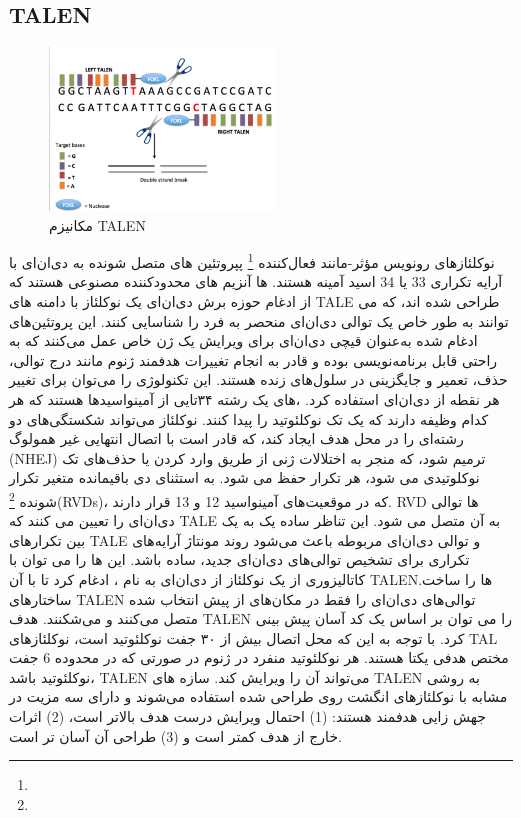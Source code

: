 \documentclass[12pt,a4paper,BCOR=.7cm,headsepline,bibliography=totoc]{report}
\begin{document}
\subsection{TALEN}
\begin{figure}
\centering
\includegraphics[width=6cm, ]{pictures/Overview_of_TALENs.png}
\caption{
مکانیزم TALEN \cite{graph3}
}\label{wrap-fig:4}
\end{figure}
نوکلئازهای رونویس مؤثر-مانند فعال‌کننده
\footnote{} 
 پپروتئین های متصل شونده به دی‌ان‌ای با آرایه تکراری 33 یا 34 اسید آمینه هستند.
ها آنزیم های محدودکننده مصنوعی هستند که از ادغام حوزه برش دی‌ان‌ای یک نوکلئاز با دامنه های TALE طراحی شده اند، که می توانند به طور خاص یک توالی دی‌ان‌ای منحصر به فرد را شناسایی کنند. این پروتئین‌های ادغام شده به‌عنوان قیچی دی‌ان‌ای برای ویرایش یک ژن خاص عمل می‌کنند که به‌ راحتی قابل برنامه‌نویسی بوده و قادر به انجام تغییرات هدفمند ژنوم مانند درج توالی، حذف، تعمیر و جایگزینی در سلول‌های زنده هستند.\cite{TALEN1} این تکنولوژی را می‌توان برای تغییر هر نقطه از دی‌ان‌ای استفاده کرد.
 ،های
 یک رشته ۳۴تایی از آمینو‌اسید‌ها هستند که هر کدام وظیفه دارند که یک تک نوکلئوتید را پیدا کنند. نوکلئاز می‌تواند شکستگی‌های دو رشته‌ای را در محل هدف ایجاد کند، که قادر است با اتصال انتهایی غیر همولوگ (NHEJ) ترمیم شود، که منجر به اختلالات ژنی از طریق وارد کردن یا حذف‌های تک نوکلوتیدی می شود، هر تکرار حفظ می شود. به استثنای دی باقیمانده متغیر تکرار شونده
\footnote{}(RVDs)،
 که در موقعیت‌های آمینواسید 12 و 13 قرار دارند. RVD ها توالی دی‌ان‌ای را تعیین می کنند که TALE به آن متصل می شود. این تناظر ساده یک به یک بین تکرارهای TALE و توالی دی‌ان‌ای مربوطه باعث می‌شود روند مونتاژ آرایه‌های تکراری برای تشخیص توالی‌های دی‌ان‌ای جدید، ساده باشد. این 
ها
 را می توان با کاتالیزوری از یک نوکلئاز از دی‌ان‌ای به نام 
، ادغام کرد تا با آن TALENها را ساخت. ساختارهای TALEN توالی‌های دی‌ان‌ای را فقط در مکان‌های از پیش انتخاب شده متصل می‌کنند و می‌شکنند. هدف TALEN را می توان بر اساس یک کد آسان پیش بینی کرد. با توجه به این که محل اتصال بیش از ۳۰ جفت نوکلئوتید است، نوکلئازهای TAL مختص هدفی یکتا هستند. هر نوکلئوتید منفرد در ژنوم در صورتی که در محدوده 6 جفت نوکلئوتید باشد، TALEN می‌تواند آن را ویرایش کند.
سازه های TALEN به روشی مشابه با نوکلئازهای انگشت روی طراحی شده استفاده می‌شوند و دارای سه مزیت در جهش زایی هدفمند هستند: (1) احتمال ویرایش درست هدف بالاتر است، (2) اثرات خارج از هدف کمتر است و (3) طراحی آن آسان تر است.\cite{TALEN2}
\end{document}
